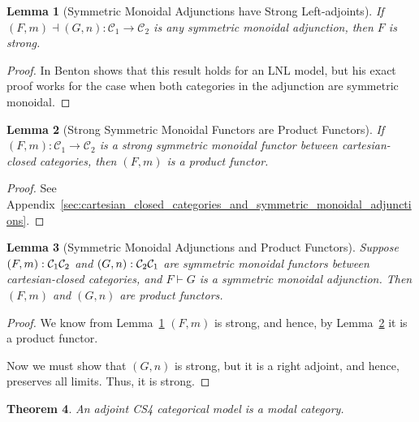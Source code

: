 \documentclass{article}
\let\mto\to
\let\to\relax
\newcommand{\to}{\rightarrow}
\newcommand{\cat}[1]{\mathcal{#1}}
\newtheorem{theorem}{Theorem}
\newtheorem{lemma}[theorem]{Lemma}
\begin{document}
\begin{lemma}[Symmetric Monoidal Adjunctions have Strong Left-adjoints]
  \label{lemma:product_functors_strong}
  If $(F,m) \dashv (G,n) : \cat{C}_1 \mto \cat{C}_2$ is any symmetric
  monoidal adjunction, then $F$ is strong.
\end{lemma}
\begin{proof}
  In \cite{benton1995} Benton shows that this result holds for an LNL
  model, but his exact proof works for the case when both categories
  in the adjunction are symmetric monoidal.  
\end{proof}

\begin{lemma}[Strong Symmetric Monoidal Functors are Product Functors]
  \label{lemma:strong-symmetric_monoidal_functors_are_product_functors}
  If $(F,m) : \cat{C}_1 \mto \cat{C}_2$ is a strong symmetric monoidal
  functor between cartesian-closed categories, then $(F,m)$ is a
  product functor.
\end{lemma}
\begin{proof}
  See Appendix~\ref{sec:cartesian_closed_categories_and_symmetric_monoidal_adjunctions}.
\end{proof}

\begin{lemma}[Symmetric Monoidal Adjunctions and Product Functors]
  \label{lemma:adjoint-CCC-prod-func}
  Suppose $(F,m) : \cat{C}_1 \to \cat{C}_2$ and $(G,n) : \cat{C}_2 \to
  \cat{C}_1$ are symmetric monoidal functors between cartesian-closed
  categories, and $F \vdash G$ is a symmetric monoidal adjunction.
  Then $(F,m)$ and $(G,n)$ are product functors.
\end{lemma}
\begin{proof}
  We know from Lemma~\ref{lemma:product_functors_strong} $(F,m)$ is
  strong, and hence, by
  Lemma~\ref{lemma:strong-symmetric_monoidal_functors_are_product_functors}
  it is a product functor.

  Now we must show that $(G,n)$ is strong, but it is a right adjoint,
  and hence, preserves all limits.  Thus, it is strong.
\end{proof}

\begin{theorem}
  An adjoint CS4 categorical model is a modal category.
\end{theorem}
\end{document}
